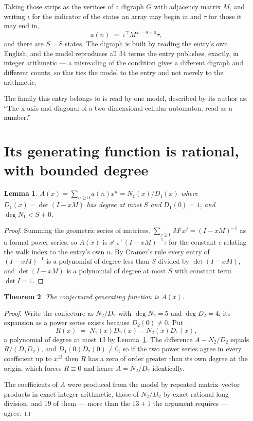 \documentclass[11pt,a4paper]{article}
\theoremstyle{plain}
\newtheorem{theorem}{Theorem}
\newtheorem{lemma}[theorem]{Lemma}
\theoremstyle{definition}
\begin{document}
Taking those strips as the vertices of a digraph $G$ with adjacency matrix $M$, and writing
$\iota$ for the indicator of the states an array may begin in and $\tau$ for those it may end
in,
\[
a(n)\;=\;\iota^{\!\top}M^{\,n-0+0}\tau ,
\]
and there are $S=8$ states. The digraph is built by reading the entry's own English, and the
model reproduces all $34$ terms the entry publishes, exactly, in integer arithmetic --- a
misreading of the condition gives a different digraph and different counts, so this ties the
model to the entry and not merely to the arithmetic.

The family this entry belongs to is read by one model, described by its author as: ``The x-axis and diagonal of a two-dimensional cellular automaton, read as a number.''


\section{Its generating function is rational, with bounded degree}

\begin{lemma}\label{lem:rat}
$A(x)=\sum_{n\ge0}a(n)x^n=N_1(x)/D_1(x)$ where $D_1(x)=\det(I-xM)$ has degree at most
$S$ and $D_1(0)=1$, and $\deg N_1<S+0$.
\end{lemma}

\begin{proof}
Summing the geometric series of matrices, $\sum_{j\ge0}M^jx^j=(I-xM)^{-1}$ as a formal
power series, so $A(x)$ is $x^{c}\,\iota^{\!\top}(I-xM)^{-1}\tau$ for the constant $c$
relating the walk index to the entry's own $n$. By Cramer's rule every entry of
$(I-xM)^{-1}$ is a polynomial of degree less than $S$ divided by $\det(I-xM)$, and
$\det(I-xM)$ is a polynomial of degree at most $S$ with constant term $\det I=1$.
\end{proof}

\begin{theorem}
The conjectured generating function is $A(x)$.
\end{theorem}

\begin{proof}
Write the conjecture as $N_2/D_2$ with $\deg N_2=5$ and $\deg D_2=4$; its expansion as a
power series exists because $D_2(0)\neq0$. Put
\[
R(x)\;=\;N_1(x)D_2(x)-N_2(x)D_1(x),
\]
a polynomial of degree at most $13$ by Lemma~\ref{lem:rat}. The difference
$A-N_2/D_2$ equals $R/(D_1D_2)$, and $D_1(0)D_2(0)\neq0$, so if the two power series agree in
every coefficient up to $x^{13}$ then $R$ has a zero of order greater than its own
degree at the origin, which forces $R\equiv0$ and hence $A=N_2/D_2$ identically.

The coefficients of $A$ were produced from the model by repeated matrix--vector products in
exact integer arithmetic, those of $N_2/D_2$ by exact rational long division, and $19$
of them --- more than the $13+1$ the argument requires --- agree.
\end{proof}
\end{document}
